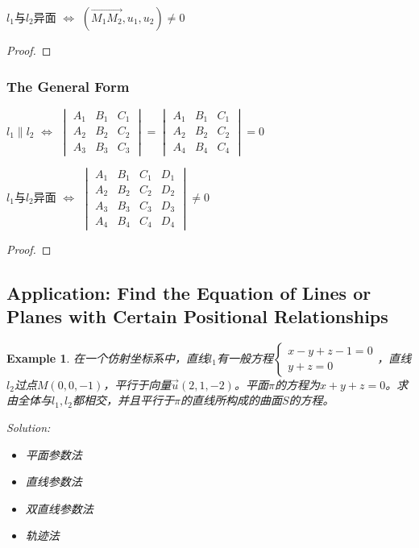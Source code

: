 \documentclass[onecolumn]{ctexart}
\newtheorem{example}{Example}
\begin{document}
$l_1$与$l_2$异面 $\Leftrightarrow$ $(\vec{M_1M_2}, u_1, u_2) \neq 0$

\begin{proof}
  
\end{proof}

\subsubsection{The General Form}

$l_1 \parallel l_2$ $\Leftrightarrow$ $
\begin{vmatrix}
  A_1 & B_1 & C_1 \\
  A_2 & B_2 & C_2 \\
  A_3 & B_3 & C_3 
\end{vmatrix} = 
\begin{vmatrix}
  A_1 & B_1 & C_1 \\
  A_2 & B_2 & C_2 \\
  A_4 & B_4 & C_4  
\end{vmatrix} = 0$

$l_1$与$l_2$异面 $\Leftrightarrow$ $
\begin{vmatrix}
  A_1 & B_1 & C_1 & D_1 \\
  A_2 & B_2 & C_2 & D_2 \\
  A_3 & B_3 & C_3 & D_3 \\
  A_4 & B_4 & C_4 & D_4
\end{vmatrix} \neq 0$

\begin{proof}
  
\end{proof}

\subsection{Application: Find the Equation of Lines or Planes with Certain Positional Relationships}

\begin{example}
  在一个仿射坐标系中，直线$l_1$有一般方程$
  \begin{cases}
    x - y + z - 1 = 0 \\
    y + z = 0
  \end{cases}$，直线$l_2$过点$M(0, 0, -1)$，平行于向量$\vec{u}(2, 1, -2)$。平面$\pi$的方程为$x + 
  y + z = 0$。求由全体与$l_1, l_2$都相交，并且平行于$\pi$的直线所构成的曲面$S$的方程。

  Solution:
  \begin{itemize}
    \item 平面参数法
    \item 直线参数法
    \item 双直线参数法
    \item 轨迹法
  \end{itemize}
\end{example}
\end{document}
